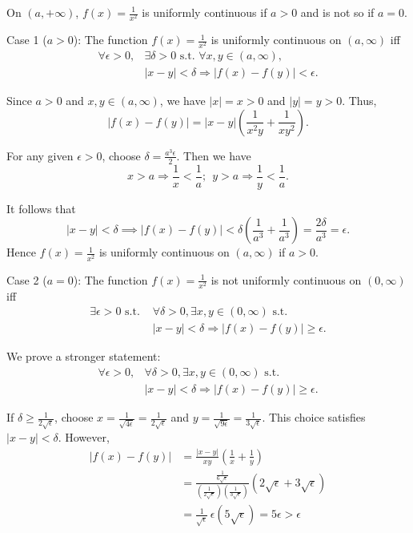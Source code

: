 \begin{exc}
  On $(a,+\infty)$,
  $f(x)=\frac{1}{x^2}$ is uniformly continuous
   if $a>0$ 
   and is not so if $a=0$.
\end{exc}
\begin{solution}
  Case 1 ($a>0$):
  The function $f(x)=\frac{1}{x^2}$ is uniformly continuous
  on $(a,\infty)$ iff
  \begin{align*}
    \forall\epsilon>0,&\exists\delta>0\text{ s.t. }
                        \forall x,y \in(a,\infty),\\
    &|x-y|<\delta\Rightarrow|f(x)-f(y)|<\epsilon.
  \end{align*}

  Since $a>0$ and $x,y \in (a,\infty)$,
  we have $|x|=x>0$ and $|y|=y>0$.  Thus,
\[
|f(x)-f(y)|
=|x-y|\left(\frac{1}{x^2y}+\frac{1}{xy^2}\right).
\]

For any given $\epsilon>0$,
choose $\delta=\frac{a^3\epsilon}{2}$.
Then we have
\begin{displaymath}
  x>a\Rightarrow\frac{1}{x}<\frac{1}{a};\ \ 
  y>a\Rightarrow\frac{1}{y}<\frac{1}{a}.
\end{displaymath}

It follows that
\[
 |x-y|<\delta  \implies 
|f(x)-f(y)|
<\delta\left(\frac{1}{a^3}+\frac{1}{a^3}\right)
=\frac{2\delta}{a^3}=\epsilon.
\]
Hence $f(x)=\frac{1}{x^2}$ is uniformly continuous on $(a,\infty)$ if
$a>0$.

Case 2 ($a=0$):
The function $f(x)=\frac{1}{x^2}$ is not uniformly continuous
on $(0,\infty)$ iff
\begin{align*}
  \exists\epsilon>0\text{ s.t. } & \forall\delta>0,
  \exists x,y \in (0,\infty)\text{ s.t. }\\
  &|x-y|<\delta\Rightarrow |f(x)-f(y)|\geq\epsilon.
\end{align*}

We prove a stronger statement:
\begin{align*}
  \forall\epsilon>0, & \forall\delta>0,\exists x,y \in (0,\infty)
  \text{ s.t. } \\
  &|x-y|<\delta\Rightarrow |f(x)-f(y)|\geq\epsilon.
\end{align*}

If $\delta\geq\frac{1}{2\sqrt{\epsilon}}$,
 choose
 $x=\frac{1}{\sqrt{4\epsilon}}=\frac{1}{2\sqrt{\epsilon}}$ and $y=\frac{1}{\sqrt{9\epsilon}}=\frac{1}{3\sqrt{\epsilon}}$.
This choice satisfies $|x-y|< \delta$.
However,
\begin{align*}
  |f(x)-f(y)| &=
                \frac{|x-y|}{xy}\left(\frac{1}{x}+\frac{1}{y}\right)\\
 &= \frac{\frac{1}{6\sqrt{\epsilon}}}{\left(\frac{1}{2\sqrt{\epsilon}}\right)\left(\frac{1}{3\sqrt{\epsilon}}\right)}(2\sqrt{\epsilon}+3\sqrt{\epsilon})
  \\
&= \frac{1}{\sqrt{\epsilon}}\,\epsilon(5\sqrt{\epsilon})
= 5\epsilon >\epsilon
\end{align*}


\end{solution}
